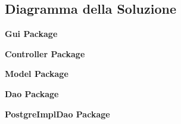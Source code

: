 \newpage
\subsection{Diagramma della Soluzione}

\begin{figure}[h]
	
\end{figure}

\newpage

\begin{center}
	\textbf{Gui Package}
\end{center}

\begin{figure}[h]
	
\end{figure}

\newpage

\begin{center}
	\textbf{Controller Package}
\end{center}

\begin{figure}[h]
	
\end{figure}

\newpage

\begin{center}
	\textbf{Model Package}
\end{center}

\begin{figure}[h]
	
\end{figure}

\newpage

\begin{center}
	\textbf{Dao Package}
\end{center}

\begin{figure}[h]
	
\end{figure}

\newpage

\begin{center}
	\textbf{PostgreImplDao Package}
\end{center}

\begin{figure}[h]
	
\end{figure}

